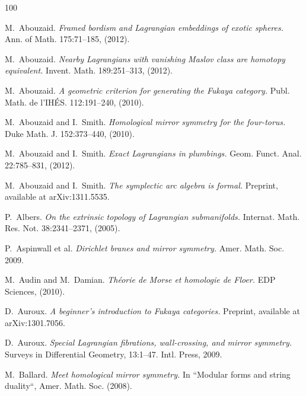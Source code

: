 \documentclass[11pt,a4paper]{article}
\numberwithin{equation}{section}
\begin{document}
\begin{thebibliography}{100}

M.~Abouzaid.
\emph{Framed bordism and Lagrangian embeddings of exotic spheres.}
Ann. of Math. 175:71--185, (2012).

M.~Abouzaid.
\emph{Nearby Lagrangians with vanishing Maslov class are homotopy equivalent.}
Invent. Math. 189:251--313, (2012).

M.~Abouzaid.
\emph{A geometric criterion for generating the Fukaya category.}
Publ. Math. de l'IH\'ES. 112:191--240, (2010).

M.~Abouzaid and I.~Smith.
\emph{Homological mirror symmetry for the four-torus.}
Duke Math. J. 152:373--440, (2010).

M.~Abouzaid and I.~Smith.
\emph{Exact Lagrangians in plumbings.}
Geom. Funct. Anal. 22:785--831, (2012).

M.~Abouzaid and I.~Smith.
\emph{The symplectic arc algebra is formal.}
Preprint, available at arXiv:1311.5535.

P.~Albers.
\emph{On the extrinsic topology of Lagrangian submanifolds.}
Internat. Math. Res. Not. 38:2341--2371, (2005).

P.~Aspinwall et al.
\emph{Dirichlet branes and mirror symmetry.}
Amer. Math. Soc. 2009.

M.~Audin and M.~Damian.
\emph{Th\'eorie de Morse et homologie de Floer.}
EDP Sciences, (2010).

D.~Auroux.
\emph{A beginner's introduction to Fukaya categories.}
Preprint, available at arXiv:1301.7056.

D.~Auroux.
\emph{Special Lagrangian fibrations, wall-crossing, and mirror symmetry.}
Surveys in Differential Geometry, 13:1--47. Intl. Press, 2009.

M.~Ballard.
\emph{Meet homological mirror symmetry.}
In ``Modular forms and string duality“, Amer. Math. Soc. (2008).


\end{thebibliography}
\end{document}
